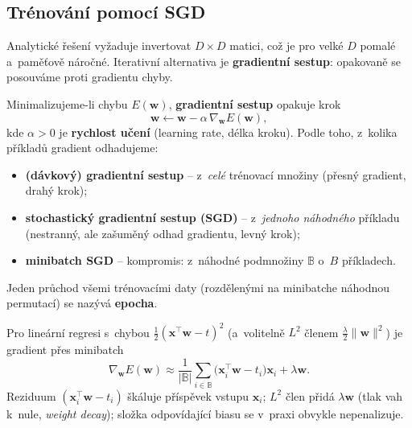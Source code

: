 \subsection{Trénování pomocí SGD}

Analytické řešení vyžaduje invertovat $D\times D$ matici, což je pro velké $D$ pomalé a~paměťově náročné. Iterativní alternativa je \textbf{gradientní sestup}: opakovaně se posouváme proti gradientu chyby.

\begin{definice}
Minimalizujeme-li chybu $E(\mathbf{w})$, \textbf{gradientní sestup} opakuje krok
\[ \mathbf{w}\leftarrow\mathbf{w}-\alpha\,\nabla_{\mathbf{w}}E(\mathbf{w}), \]
kde $\alpha>0$ je \textbf{rychlost učení} (learning rate, délka kroku). Podle toho, z~kolika příkladů gradient odhadujeme:
\begin{itemize}
  \item \textbf{(dávkový) gradientní sestup} -- z~\emph{celé} trénovací množiny (přesný gradient, drahý krok);
  \item \textbf{stochastický gradientní sestup (SGD)} -- z~\emph{jednoho náhodného} příkladu (nestranný, ale zašuměný odhad gradientu, levný krok);
  \item \textbf{minibatch SGD} -- kompromis: z~náhodné podmnožiny $\mathbb{B}$ o~$B$ příkladech.
\end{itemize}
Jeden průchod všemi trénovacími daty (rozdělenými na minibatche náhodnou permutací) se nazývá \textbf{epocha}.
\end{definice}

Pro lineární regresi s~chybou $\tfrac12(\mathbf{x}^{\!\top}\mathbf{w}-t)^2$ (a~volitelně $L^2$ členem $\tfrac\lambda2\|\mathbf{w}\|^2$) je gradient přes minibatch
\[ \nabla_{\mathbf{w}}E(\mathbf{w})\approx\frac{1}{|\mathbb{B}|}\sum_{i\in\mathbb{B}}\big(\mathbf{x}_i^{\!\top}\mathbf{w}-t_i\big)\mathbf{x}_i+\lambda\mathbf{w}. \]
Reziduum $(\mathbf{x}_i^{\!\top}\mathbf{w}-t_i)$ škáluje příspěvek vstupu $\mathbf{x}_i$; $L^2$ člen přidá $\lambda\mathbf{w}$ (tlak vah k~nule, \emph{weight decay}); složka odpovídající biasu se v~praxi obvykle nepenalizuje.

